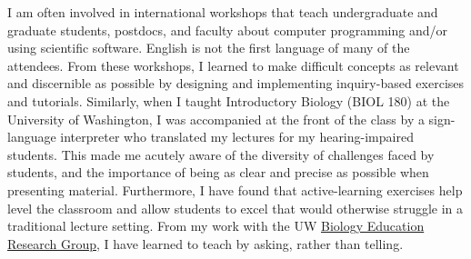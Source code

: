 I am often involved in international workshops that teach undergraduate and
graduate students, postdocs, and faculty about computer programming and/or
using scientific software.
English is not the first language of many of the attendees.
From these workshops, I learned to make difficult concepts as relevant and
discernible as possible by designing and implementing inquiry-based exercises
and tutorials.
Similarly, when I taught Introductory Biology (BIOL 180) at the University of
Washington, I was accompanied at the front of the class by a sign-language
interpreter who translated my lectures for my hearing-impaired students.
This made me acutely aware of the diversity of challenges faced by
students, and the importance of being as clear and precise as possible when
presenting material.
Furthermore, I have found that active-learning exercises help level the
classroom and allow students to excel that would otherwise struggle in a
traditional lecture setting.
From my work with the UW
\href{https://sites.google.com/site/uwbioedresgroup/home}{Biology Education
    Research Group}, I have learned to teach by asking, rather than telling.


